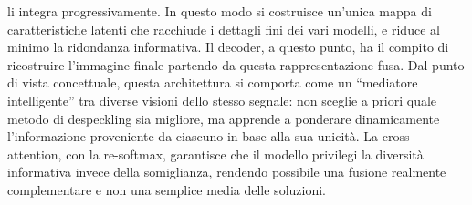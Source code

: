 li integra progressivamente. In questo modo si costruisce un’unica mappa di caratteristiche latenti che racchiude i dettagli fini dei vari modelli, 
e riduce al minimo la ridondanza informativa.
Il decoder, a questo punto, ha il compito di ricostruire l’immagine finale partendo da questa rappresentazione fusa. 
Dal punto di vista concettuale, questa architettura si comporta come un “mediatore intelligente” tra diverse visioni dello stesso segnale: non 
sceglie a priori quale metodo di despeckling sia migliore, ma apprende a ponderare dinamicamente l’informazione proveniente da ciascuno in base 
alla sua unicità. La cross-attention, con la re-softmax, garantisce che il modello privilegi la diversità informativa invece della somiglianza, 
rendendo possibile una fusione realmente complementare e non una semplice media delle soluzioni.


